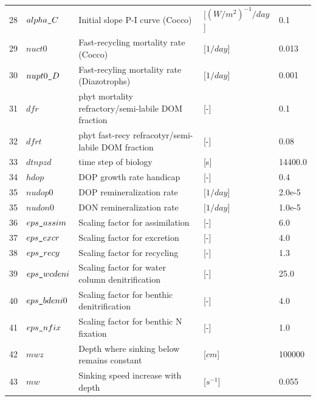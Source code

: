 \documentclass[a4paper]{article}
\begin{document}
\begin{itemize}
{\begin{longtable}{lllll}
   28  & $alpha\verb|_|C$   & Initial slope P-I curve (Cocco)                             & [$(W/m^2)^{-1}/day$]          & 0.1        \\
   29  & $nuct0$            & Fast-recycling mortality rate (Cocco)                       & [$1/day$]                     & 0.013      \\
   30  & $nupt0\verb|_|D$   & Fast-recyling mortality rate (Diazotrophs)                  & [$1/day$]                     & 0.001      \\
   31  & $dfr$              & phyt mortality refractory/semi-labile DOM fraction          & [-]                           & 0.1        \\
   32  & $dfrt$             & phyt fast-recy refracotyr/semi-labile DOM fraction          & [-]                           & 0.08       \\
   33  & $dtnpzd$           & time step of biology                                        & [s]                           & 14400.0    \\
   34  & $hdop$             & DOP growth rate handicap                                    & [-]                           & 0.4       \\
   35  & $nudop0$           & DOP remineralization rate                                   & [$1/day$]                     & 2.0e-5    \\
   35  & $nudon0$           & DON remineralization rate                                   & [$1/day$]                     & 1.0e-5    \\
   36  & $eps\verb|_|assim$ & Scaling factor for assimilation                             & [-]                           & 6.0       \\
   37  & $eps\verb|_|excr$  & Scaling factor for excretion                                & [-]                           & 4.0       \\
   38  & $eps\verb|_|recy$  & Scaling factor for recycling                                & [-]                           & 1.3       \\
   39  & $eps\verb|_|wcdeni$& Scaling factor for water column denitrification             & [-]                           & 25.0      \\
   40  & $eps\verb|_|bdeni0$& Scaling factor for benthic denitrification                  & [-]                           & 4.0      \\
   41  & $eps\verb|_|nfix$  & Scaling factor for benthic N fixation                       & [-]                           & 1.0      \\
   42  & $mwz$              & Depth where sinking below remains constant                  & [$cm$]                        & 100000    \\
   43  & $mw$               & Sinking speed increase with depth                           & [$s^{-1}$]                    & 0.055     \\ \hline
   \end{longtable}}


\end{itemize}
\end{document}
